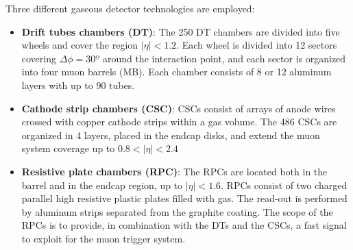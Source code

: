 Three different gaseous detector technologies are employed:
\begin{itemize}
    \item \textbf{Drift tubes chambers (DT)}: The 250 DT chambers are divided into five wheels and cover the region $|\eta|<1.2$. Each wheel is divided into 12 sectors covering $\Delta \phi=30º$ around the interaction point, and each sector is organized into four muon barrels (MB).
    Each chamber consists of 8 or 12 aluminum layers with up to 90 tubes.

    \item \textbf{Cathode strip chambers (CSC)}: CSCs consist of arrays of anode wires crossed with copper cathode strips within a gas volume. The 486 CSCs are organized in 4 layers, placed in the endcap disks, and extend the muon system coverage up to $0.8<|\eta|<2.4$

    
    \item \textbf{Resistive plate chambers (RPC)}: The RPCs are located both in the barrel and in the endcap region, up to $|\eta|<1.6$. RPCs consist of two charged parallel high resistive plastic plates filled with gas. The read-out is performed by aluminum strips separated from the graphite coating. The scope of the RPCs is to provide, in combination with the DTs and the CSCs, a fast signal to exploit for the muon trigger system.
\end{itemize}

